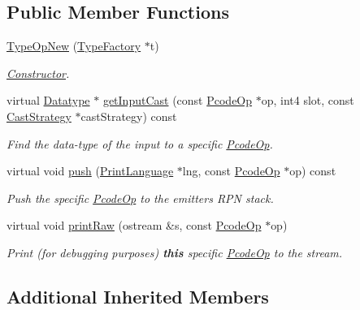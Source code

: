 \subsection*{Public Member Functions}
\begin{DoxyCompactItemize}
\item 
\mbox{\hyperlink{class_type_op_new_a766488cfad417b42a0d16e0664fa9995}{Type\+Op\+New}} (\mbox{\hyperlink{class_type_factory}{Type\+Factory}} $\ast$t)
\begin{DoxyCompactList}\small\item\em \mbox{\hyperlink{class_constructor}{Constructor}}. \end{DoxyCompactList}\item 
virtual \mbox{\hyperlink{class_datatype}{Datatype}} $\ast$ \mbox{\hyperlink{class_type_op_new_a216fef1014a8a0a4f85208728fa7b1e0}{get\+Input\+Cast}} (const \mbox{\hyperlink{class_pcode_op}{Pcode\+Op}} $\ast$op, int4 slot, const \mbox{\hyperlink{class_cast_strategy}{Cast\+Strategy}} $\ast$cast\+Strategy) const
\begin{DoxyCompactList}\small\item\em Find the data-\/type of the input to a specific \mbox{\hyperlink{class_pcode_op}{Pcode\+Op}}. \end{DoxyCompactList}\item 
virtual void \mbox{\hyperlink{class_type_op_new_afd623815d8c19c3cdd8e1d3d439e932c}{push}} (\mbox{\hyperlink{class_print_language}{Print\+Language}} $\ast$lng, const \mbox{\hyperlink{class_pcode_op}{Pcode\+Op}} $\ast$op) const
\begin{DoxyCompactList}\small\item\em Push the specific \mbox{\hyperlink{class_pcode_op}{Pcode\+Op}} to the emitter\textquotesingle{}s R\+PN stack. \end{DoxyCompactList}\item 
virtual void \mbox{\hyperlink{class_type_op_new_aa227f62ca7c9a75fd62ecc2932e3d746}{print\+Raw}} (ostream \&s, const \mbox{\hyperlink{class_pcode_op}{Pcode\+Op}} $\ast$op)
\begin{DoxyCompactList}\small\item\em Print (for debugging purposes) {\bfseries{this}} specific \mbox{\hyperlink{class_pcode_op}{Pcode\+Op}} to the stream. \end{DoxyCompactList}\end{DoxyCompactItemize}
\subsection*{Additional Inherited Members}


